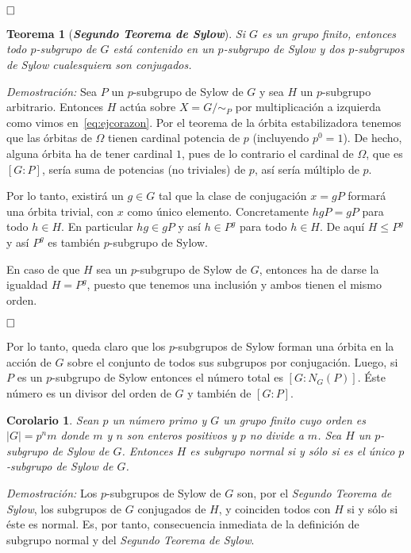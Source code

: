 \documentclass[12pt]{article}
\newtheorem{theorem}{Teorema}[section]
\newtheorem{corolario}{Corolario}[theorem]
\begin{document}
$\hfill \square$

\begin{theorem}[\textbf{\textit{Segundo Teorema de Sylow}}]Si $G$ es un grupo finito, entonces todo $p$-subgrupo de $G$ está contenido en un $p$-subgrupo de Sylow y dos $p$-subgrupos de Sylow cualesquiera son conjugados.

\end{theorem}
\emph{Demostración: }Sea $P$ un $p$-subgrupo de Sylow de $G$ y sea $H$ un $p$-subgrupo arbitrario. Entonces $H$ actúa sobre $X= G/\sim_{P}$ por multiplicación a izquierda como vimos en~\ref{eq:ejcorazon}. Por el teorema de la órbita estabilizadora tenemos que las órbitas de $\Omega$ tienen cardinal potencia de $p$ (incluyendo $p^{0}=1$). De hecho, alguna órbita ha de tener cardinal $1$, pues de lo contrario el cardinal de $\Omega$, que es $[G:P]$, sería suma de potencias (no triviales) de $p$, así sería múltiplo de $p$.

Por lo tanto, existirá un $g \in G$ tal que la clase de conjugación $x = gP$ formará una órbita trivial, con $x$ como único elemento. Concretamente $hgP = gP$ para todo $h \in H$. En particular $hg \in gP$ y así $h \in P^{g}$ para todo $h \in H$. De aquí $H \leq P^{g}$ y así $P^{g}$ es también $p$-subgrupo de Sylow.

En caso de que $H$ sea un $p$-subgrupo de Sylow de $G$, entonces ha de darse la igualdad $H = P^{g}$, puesto que tenemos una inclusión y ambos tienen el mismo orden.

$\hfill \square$

Por lo tanto, queda claro que los $p$-subgrupos de Sylow forman una órbita en la acción de $G$ sobre el conjunto de todos sus subgrupos por conjugación. Luego, si $P$ es un $p$-subgrupo de Sylow entonces el número total es $[G: N_{G}(P)]$. Éste número es un divisor del orden de $G$ y también de $[G:P]$.

\begin{corolario}Sean $p$ un número primo y $G$ un grupo finito cuyo orden es $|G| = p^{n}m$ donde $m$ y $n$ son enteros positivos y $p$ no divide a $m$. Sea $H$ un $p$-subgrupo de Sylow de $G$. Entonces $H$ es subgrupo normal si y sólo si es el único $p$-subgrupo de Sylow de $G$.
\end{corolario}
\emph{Demostración: }Los $p$-subgrupos de Sylow de $G$ son, por el \textit{Segundo Teorema de Sylow}, los subgrupos de $G$ conjugados de $H$, y coinciden todos con $H$ si y sólo si éste es normal. Es, por tanto, consecuencia inmediata de la definición de subgrupo normal y del \textit{Segundo Teorema de Sylow}.
\end{document}
